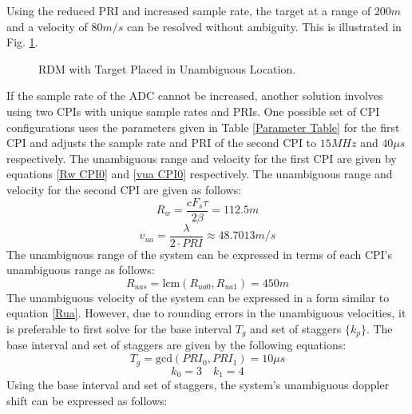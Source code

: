 \documentclass[conference]{IEEEtran}
\begin{document}
Using the reduced PRI and increased sample rate, the target at a range of $200m$ and a velocity of $80m/s$ can be resolved without ambiguity. This is illustrated in Fig. \ref{RDM3_resolvable}.
\begin{figure}[H]
\centerline{}
\caption{RDM with Target Placed in Unambiguous Location.}
\label{RDM3_resolvable}
\end{figure}
If the sample rate of the ADC cannot be increased, another solution involves using two CPIs with unique sample rates and PRIs. One possible set of CPI configurations uses the parameters given in Table \ref{Parameter Table} for the first CPI and adjusts the sample rate and PRI of the second CPI to $15MHz$ and $40\mu s$ respectively. The unambiguous range and velocity for the first CPI are given by equations \ref{Rw CPI0} and \ref{vua CPI0} respectively. The unambiguous range and velocity for the second CPI are given as follows:
\begin{equation}
R_w = \frac{c F_s \tau}{2\beta} = 112.5m
\end{equation}
\begin{equation}
v_{ua} = \frac{\lambda}{2\cdot PRI} \approx 48.7013 m/s
\end{equation}
The unambiguous range of the system can be expressed in terms of each CPI's unambiguous range as follows:
\begin{equation}
\label{Rua}
R_{uas} = \text{lcm}(R_{ua0}, R_{ua1}) = 450m
\end{equation}
The unambiguous velocity of the system can be expressed in a form similar to equation \ref{Rua}. However, due to rounding errors in the unambiguous velocities, it is preferable to first solve for the base interval $T_g$ and set of staggers $\{k_p\}$. The base interval and set of staggers are given by the following equations:
\begin{equation}
T_g = \text{gcd}(PRI_0,PRI_1) = 10\mu s
\end{equation}
\begin{equation}
k_0 = 3 \quad k_1 = 4
\end{equation}
Using the base interval and set of staggers, the system's unambiguous doppler shift can be expressed as follows:
\end{document}

